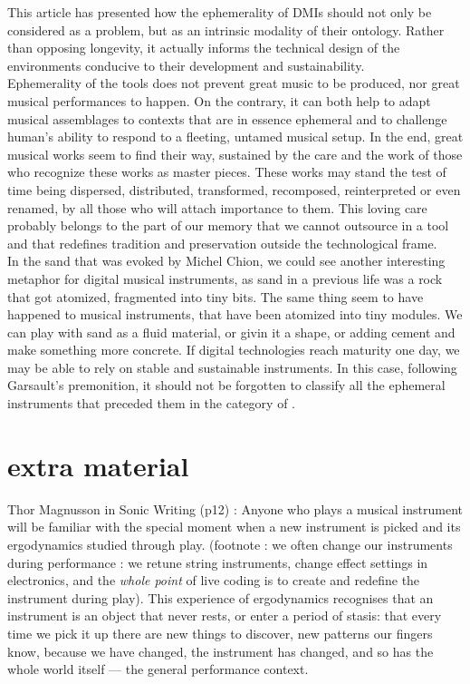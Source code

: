 This article has presented how the ephemerality of DMIs should not only be considered as a problem, but as an intrinsic modality of their ontology. Rather than opposing longevity, it actually informs the technical design of the environments conducive to their development and sustainability.\\
\indent Ephemerality of the tools does not prevent great music to be produced, nor great musical performances to happen. On the contrary, it can both help to adapt musical assemblages to contexts that are in essence ephemeral and to challenge human's ability to respond to a fleeting, untamed musical setup. In the end, great musical works seem to find their way, sustained by the care and the work of those who recognize these works as master pieces. These works may stand the test of time being dispersed, distributed, transformed, recomposed, reinterpreted or even renamed, by all those who will attach importance to them. This loving care probably belongs to the part of our memory that we cannot outsource in a tool and that redefines tradition and preservation outside the technological frame.\\
\indent In the sand that was evoked by Michel Chion, we could see another interesting metaphor for digital musical instruments, as sand in a previous life was a rock that got atomized, fragmented into tiny bits. The same thing seem to have happened to musical instruments, that have been atomized into tiny modules. We can play with sand as a fluid material, or givin it a shape, or adding cement and make something more concrete.
\indent If digital technologies reach maturity one day, we may be able to rely on stable and sustainable instruments. In this case, following Garsault's premonition, it should not be forgotten to classify all the ephemeral instruments that preceded them in the category of .


\section{extra material}

Thor Magnusson in Sonic Writing (p12) : Anyone who plays a musical instrument will be familiar with the special moment when a new instrument is picked and its ergodynamics studied through play. (footnote : we often change our instruments during performance : we retune string instruments, change effect settings in electronics, and the \textit{whole point} of live coding is to create and redefine the instrument during play). This experience of ergodynamics recognises that an instrument is an object that never rests, or enter a period of stasis: that every time we pick it up there are new things to discover, new patterns our fingers know, because we have changed, the instrument has changed, and so has the whole world itself — the general performance context.

